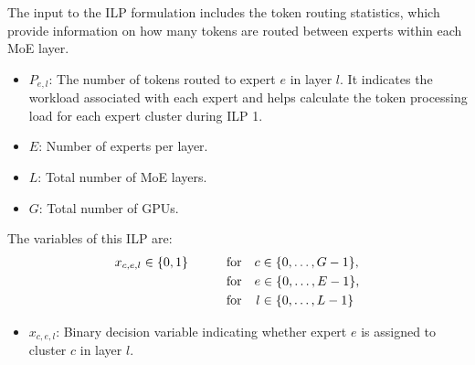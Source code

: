 The input to the ILP formulation includes the token routing statistics, which provide information on how many tokens are routed between experts within each MoE layer. 
%
\begin{itemize}[leftmargin=*]
    \vspace{-0.5em}
    \item \( P_{e,l} \): The number of tokens routed to expert \( e \) in layer \( l \). It indicates the workload associated with each expert and helps calculate the token processing load for each expert cluster during ILP 1.
    \vspace{-0.5em}
    \item \(E\): Number of experts per layer.
    \vspace{-0.5em}
    \item \(L\): Total number of MoE layers.
    \vspace{-0.5em}
    \item \(G\): Total number of GPUs.
\end{itemize}
%
The variables of this ILP are:
\vspace{-0.5em}
\begin{align*}
    x_{c,e,l} \in \{0, 1\} \quad \quad \quad &\text{for} \quad c \in \{0, \dots, G-1\}, \\
    &\text{for} \quad e \in \{0, \dots, E-1\}, \\
    &\text{for} \quad \hspace{0.12em} l \in \{0, \dots, L-1\}
\end{align*}
\begin{itemize}
\vspace{-1.5em}
\item \( x_{c,e,l} \): Binary decision variable indicating whether expert \( e \) is assigned to cluster \( c \) in layer \( l \).
\end{itemize}


